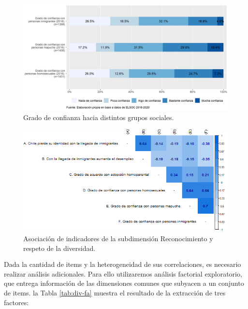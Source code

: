 \documentclass[
  12pt,
]{book}
\begin{document}
\begin{figure}[H]

{\centering \includegraphics[width=1\linewidth,height=1\textheight]{output/graphs/diversidad} 

}

\caption{Grado de confianza hacia distintos grupos sociales.}\label{fig:diversidad}
\end{figure}

\begin{figure}[H]

{\centering \includegraphics[width=1\linewidth,height=1\textheight]{output/graphs/diversidad_cor} 

}

\caption{Asociación de indicadores de la subdimensión Reconocimiento y respeto de la diversidad.}\label{fig:diversidad-cor}
\end{figure}

Dada la cantidad de items y la heterogeneidad de sus correlaciones, es necesario realizar análisis adicionales. Para ello utilizaremos análisis factorial exploratorio, que entrega información de las dimensiones comunes que subyacen a un conjunto de items. la Tabla \ref{tab:div-fa} muestra el resultado de la extracción de tres factores:
\end{document}
